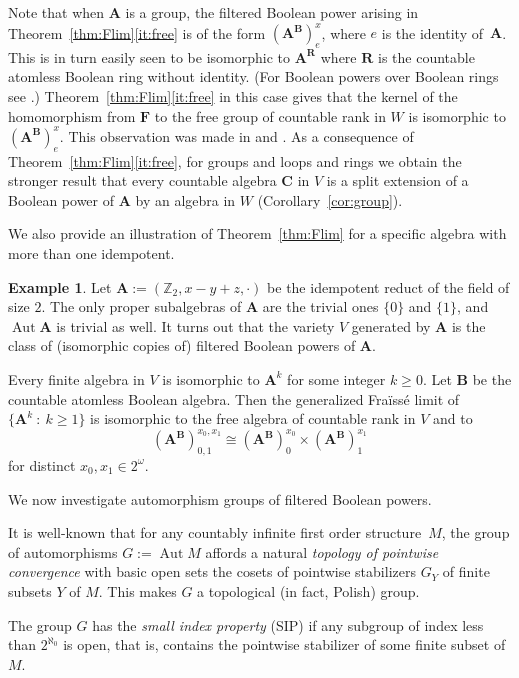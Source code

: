 \documentclass[12pt,a4paper,reqno]{amsart}
\numberwithin{equation}{section}
\theoremstyle{plain}
\theoremstyle{definition}
\newtheorem{exa}[thm]{Example}
\newcommand{\A}{\mathbf{A}}
\newcommand{\AB}{\mathbf{A^B}}
\newcommand{\B}{\mathbf{B}}
\newcommand{\C}{\mathbf{C}}
\newcommand{\F}{\mathbf{F}}
\newcommand{\R}{\mathbf{R}}
\newcommand{\Z}{\mathbb{Z}}
\DeclareMathOperator{\Aut}{Aut}
\newcommand{\st}{\: :\:}
\begin{document}
Note that when $\A$ is a group, the filtered Boolean power arising in Theorem~\ref{thm:Flim}\eqref{it:free} is of the form
$(\A^\B)^x_e$, where $e$ is the identity of~$\A$. This is in turn easily seen to be isomorphic to $\A^\R$ where $\R$ is the countable atomless Boolean ring without identity. (For Boolean powers over Boolean rings see \cite{Ap:BPG,HiPl:BPDP}.) 
Theorem~\ref{thm:Flim}\eqref{it:free}
in this case gives that the kernel of the homomorphism from $\F$ to the free group of countable rank in $W$ is isomorphic to $(\A^\B)^x_e$. This observation was made in \cite[p.\ 367-8]{BE:SIP} and \cite[p.\ 201]{BG:ARFG}.
As a consequence of Theorem~\ref{thm:Flim}\eqref{it:free},
for groups and  loops and rings we obtain
the stronger result that every countable algebra $\C$ in $V$ is a split
 extension of a Boolean power of $\A$ by an algebra in $W$ (Corollary~\ref{cor:group}).

 We also provide an illustration of Theorem~\ref{thm:Flim} for a specific algebra with more than one idempotent.

\begin{exa} \label{exa:twoids}
 Let $\A := (\Z_2,x-y+z,\cdot)$ be the idempotent reduct of the field of size $2$.
 The only proper subalgebras of $\A$ are the trivial ones $\{0\}$ and $\{1\}$, and $\Aut\A$ is trivial as well.
 It turns out that the variety $V$ generated by $\A$ is the class of (isomorphic copies of) filtered Boolean
 powers of $\A$.

 Every finite algebra in $V$ is isomorphic to $\A^k$ for some integer $k\geq 0$. 
 Let $\B$ be the countable atomless Boolean algebra. Then the generalized Fra{\"i}ss{\'e} limit of $\{ \A^k \st k\geq 1 \}$
 is isomorphic to the free algebra of countable rank in $V$ and to
\[ (\AB)_{0,1}^{x_0,x_1} \cong (\AB)_0^{x_0} \times (\AB)_1^{x_1} \]
 for distinct $x_0,x_1\in 2^\omega$.
\end{exa} 

 We now investigate automorphism groups of filtered Boolean powers.

 It is well-known that for any countably infinite first order structure~$M$, 
 the group of automorphisms
 $G := \Aut M$ affords a natural \emph{topology of pointwise convergence} with basic open sets the cosets of
 pointwise  stabilizers
$G_Y$ of finite subsets $Y$ of $M$.
 This makes $G$ a topological (in fact, Polish) group.

 The group $G$ has the \emph{small index property} (SIP) if any subgroup of index less than
 $2^{\aleph_0}$ is open, that is, contains the pointwise stabilizer of some finite subset of $M$.
\end{document}
